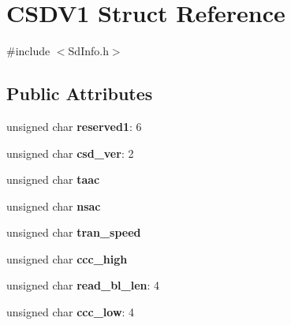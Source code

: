 \hypertarget{struct_c_s_d_v1}{}\section{C\+S\+D\+V1 Struct Reference}
\label{struct_c_s_d_v1}


{\ttfamily \#include $<$Sd\+Info.\+h$>$}

\subsection*{Public Attributes}
\begin{DoxyCompactItemize}
\item 
unsigned char {\bfseries reserved1}\+: 6\hypertarget{struct_c_s_d_v1_a5530f16d8628eab90c02d4e97926fa3b}{}\label{struct_c_s_d_v1_a5530f16d8628eab90c02d4e97926fa3b}

\item 
unsigned char {\bfseries csd\+\_\+ver}\+: 2\hypertarget{struct_c_s_d_v1_aad5f21595470e6d74c5e6535262ae391}{}\label{struct_c_s_d_v1_aad5f21595470e6d74c5e6535262ae391}

\item 
unsigned char {\bfseries taac}\hypertarget{struct_c_s_d_v1_a8092b9bbbdae4b8510a8b7f694242ad3}{}\label{struct_c_s_d_v1_a8092b9bbbdae4b8510a8b7f694242ad3}

\item 
unsigned char {\bfseries nsac}\hypertarget{struct_c_s_d_v1_a3c542225f23fd6bea992f65c3480e31f}{}\label{struct_c_s_d_v1_a3c542225f23fd6bea992f65c3480e31f}

\item 
unsigned char {\bfseries tran\+\_\+speed}\hypertarget{struct_c_s_d_v1_a12cb51c57de51ac4bbb38857a8b3f54d}{}\label{struct_c_s_d_v1_a12cb51c57de51ac4bbb38857a8b3f54d}

\item 
unsigned char {\bfseries ccc\+\_\+high}\hypertarget{struct_c_s_d_v1_afa4673f4fd39dabfc7dd335aa4c09775}{}\label{struct_c_s_d_v1_afa4673f4fd39dabfc7dd335aa4c09775}

\item 
unsigned char {\bfseries read\+\_\+bl\+\_\+len}\+: 4\hypertarget{struct_c_s_d_v1_a608e8bdb9408bb42f4d6b44577ce1b99}{}\label{struct_c_s_d_v1_a608e8bdb9408bb42f4d6b44577ce1b99}

\item 
unsigned char {\bfseries ccc\+\_\+low}\+: 4\hypertarget{struct_c_s_d_v1_a98f85974ffd581c7a7ca4bae1035b857}{}\label{struct_c_s_d_v1_a98f85974ffd581c7a7ca4bae1035b857}


\end{DoxyCompactItemize}
